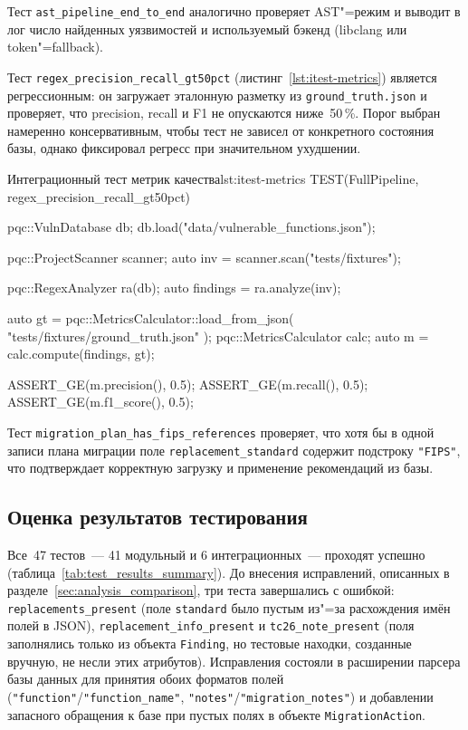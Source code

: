Тест \texttt{ast\_pipeline\_end\_to\_end} аналогично проверяет AST"=режим
и выводит в лог число найденных уязвимостей и используемый бэкенд
(libclang или token"=fallback).

Тест \texttt{regex\_precision\_recall\_gt50pct}
(листинг~\ref{lst:itest-metrics}) является регрессионным: он загружает
эталонную разметку из \texttt{ground\_truth.json} и проверяет, что
precision, recall и F1 не опускаются ниже~50\,\%.
Порог выбран намеренно консервативным, чтобы тест не зависел от
конкретного состояния базы, однако фиксировал регресс при значительном
ухудшении.

\begin{itmolisting}[C++]{Интеграционный тест метрик качества}{lst:itest-metrics}
TEST(FullPipeline, regex_precision_recall_gt50pct) {
    pqc::VulnDatabase db;
    db.load("data/vulnerable_functions.json");

    pqc::ProjectScanner scanner;
    auto inv = scanner.scan("tests/fixtures");

    pqc::RegexAnalyzer ra(db);
    auto findings = ra.analyze(inv);

    auto gt = pqc::MetricsCalculator::load_from_json(
        "tests/fixtures/ground_truth.json"
    );
    pqc::MetricsCalculator calc;
    auto m = calc.compute(findings, gt);

    ASSERT_GE(m.precision(), 0.5);
    ASSERT_GE(m.recall(),    0.5);
    ASSERT_GE(m.f1_score(),  0.5);
}
\end{itmolisting}

Тест \texttt{migration\_plan\_has\_fips\_references} проверяет, что
хотя бы в одной записи плана миграции поле \texttt{replacement\_standard}
содержит подстроку \texttt{"FIPS"}, что подтверждает корректную
загрузку и применение рекомендаций из базы.

\subsection{Оценка результатов тестирования}

Все~47 тестов~--- 41 модульный и 6 интеграционных~--- проходят
успешно (таблица~\ref{tab:test_results_summary}).
До внесения исправлений, описанных в разделе~\ref{sec:analysis_comparison},
три теста завершались с ошибкой:
\texttt{replacements\_present} (поле \texttt{standard} было пустым
из"=за расхождения имён полей в JSON),
\texttt{replacement\_info\_present} и \texttt{tc26\_note\_present}
(поля заполнялись только из объекта \texttt{Finding}, но тестовые
находки, созданные вручную, не несли этих атрибутов).
Исправления состояли в расширении парсера базы данных для принятия
обоих форматов полей (\texttt{"function"}/\texttt{"function\_name"},
\texttt{"notes"}/\texttt{"migration\_notes"}) и добавлении запасного
обращения к базе при пустых полях в объекте \texttt{MigrationAction}.

